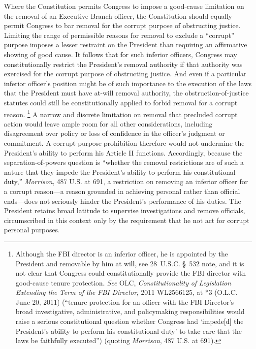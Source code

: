 Where the Constitution permits Congress to impose a good-cause limitation on the removal of an Executive Branch officer, the Constitution should equally permit Congress to bar removal for the corrupt purpose of obstructing justice.
Limiting the range of permissible reasons for removal to exclude a ``corrupt'' purpose imposes a lesser restraint on the President than requiring an affirmative showing of good cause.
It follows that for such inferior officers, Congress may constitutionally restrict the President's removal authority if that authority was exercised for the corrupt purpose of obstructing justice.
And even if a particular inferior officer's position might be of such importance to the execution of the laws that the President must have at-will removal authority, the obstruction-of-justice statutes could still be constitutionally applied to forbid removal for a corrupt reason.%
\footnote{Although the FBI director is an inferior officer, he is appointed by the President and removable by him at will, see 28~U.S.C. \S~532 note, and it is not clear that Congress could constitutionally provide the FBI director with good-cause tenure protection.
\textit{See} OLC, \textit{Constitutionality of Legislation Extending the Term of the FBI Director}, 2011 WL2566125, at *3 (O.L.C. June 20, 2011) (``tenure protection for an officer with the FBI Director's broad investigative, administrative, and policymaking responsibilities would raise a serious constitutional question whether Congress had `impede[d] the President's ability to perform his constitutional duty' to take care that the laws be faithfully executed'') (quoting \textit{Morrison}, 487 U.S. at 691).}
A narrow and discrete limitation on removal that precluded corrupt action would leave ample room for all other considerations, including disagreement over policy or loss of confidence in the officer's judgment or commitment.
A corrupt-purpose prohibition therefore would not undermine the President's ability to perform his Article II functions.
Accordingly, because the separation-of-powers question is ``whether the removal restrictions are of such a nature that they impede the President's ability to perform his constitutional duty,'' \textit{Morrison}, 487 U.S. at 691, a restriction on removing an inferior officer for a corrupt reason---a reason grounded in achieving personal rather than official ends---does not seriously hinder the President's performance of his duties.
The President retains broad latitude to supervise investigations and remove officials, circumscribed in this context only by the requirement that he not act for corrupt personal purposes.%
